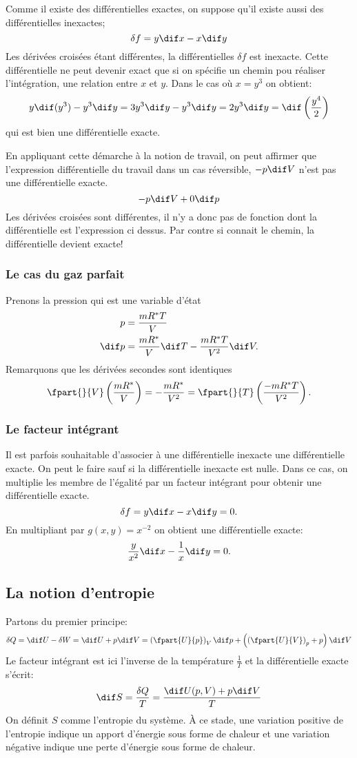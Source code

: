 Comme il existe des différentielles exactes,
on suppose qu'il existe aussi des différentielles inexactes;
\[ \delta f = y\dif x - x\dif y \]
Les dérivées croisées étant différentes,
la différentielles $\delta f$ est inexacte.
Cette différentielle ne peut devenir exact que si
on spécifie un chemin pou réaliser l'intégration, une relation entre $x$ et $y$.
Dans le cas où $x = y^3$ on obtient:
\[  y\dif(y^3)-y^3\dif y = 3y^3\dif y-y^3\dif y
= 2y^3\dif y = \dif\left(\frac{y^4}{2}\right) \]
qui est bien une différentielle exacte.

En appliquant cette démarche à la notion de travail,
on peut affirmer que l'expression différentielle du travail
dans un cas réversible, $-p\dif V$ n'est pas une différentielle exacte.
\[ -p\dif V+0\dif p \]
Les dérivées croisées sont différentes,
il n'y a donc pas de fonction dont la différentielle est l'expression ci dessus.
Par contre si connait le chemin, la différentielle devient exacte!
\subsubsection{Le cas du gaz parfait}
Prenons la pression qui est une variable d'état
\begin{align*}
  p & = \frac{mR^*T}{V}\\
  \dif p & = \frac{mR^*}{V}\dif T-\frac{mR^*T}{V^2}\dif V.
\end{align*}
Remarquons que les dérivées secondes sont identiques
\[ \fpart{}{V} \left(\frac{mR^*}{V}\right) =
-\frac{mR^*}{V^2} = \fpart{}{T}
\left(\frac{-mR^*T}{V^2}\right). \]

\subsubsection{Le facteur intégrant}
Il est parfois souhaitable d'associer à une différentielle
inexacte une différentielle exacte.
On peut le faire sauf si la différentielle inexacte est nulle.
Dans ce cas, on multiplie les membre de l'égalité par un facteur intégrant
pour obtenir une différentielle exacte.
\[ \delta f = y\dif x-x\dif y = 0. \]
En multipliant par $g(x,y) = x^{-2}$ on obtient une différentielle exacte:
\[ \frac y {x^2} \dif x -\frac 1x\dif y = 0. \]
\subsection{La notion d'entropie}
Partons du premier principe:
\[ \delta Q = \dif U - \delta W = \dif U +p\dif V =
\left(\fpart{U}{p}\right)_V \dif p +
\left ( \left ( \fpart{U}{V}\right)_p + p \right)\dif V \]
Le facteur intégrant est ici l'inverse de la température
$\frac{1}{T}$ et la différentielle exacte s'écrit:
\[ \dif S = \frac{\delta Q}{T} = \frac{\dif U(p,V)+p\dif V }T \]
On définit $S$ comme l'entropie du système.
À ce stade, une variation positive de l'entropie
indique un apport d'énergie sous forme de chaleur et
une variation négative indique une perte d'énergie sous forme de chaleur.

